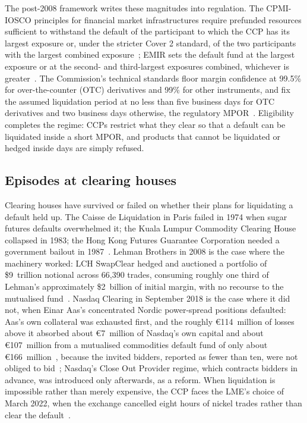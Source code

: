 \documentclass[11pt,a4paper]{article}
\begin{document}
The post-2008 framework writes these magnitudes into regulation. The CPMI-IOSCO principles for financial market infrastructures require prefunded resources sufficient to withstand the default of the participant to which the CCP has its largest exposure or, under the stricter Cover 2 standard, of the two participants with the largest combined exposure~\cite{pfmi}; EMIR sets the default fund at the largest exposure or at the second- and third-largest exposures combined, whichever is greater~\cite{emir}. The Commission's technical standards floor margin confidence at 99.5\% for over-the-counter (OTC) derivatives and 99\% for other instruments, and fix the assumed liquidation period at no less than five business days for OTC derivatives and two business days otherwise, the regulatory MPOR~\cite{cdr153}. Eligibility completes the regime: CCPs restrict what they clear so that a default can be liquidated inside a short MPOR, and products that cannot be liquidated or hedged inside days are simply refused.

\subsection{Episodes at clearing houses}

Clearing houses have survived or failed on whether their plans for liquidating a default held up. The Caisse de Liquidation in Paris failed in 1974 when sugar futures defaults overwhelmed it; the Kuala Lumpur Commodity Clearing House collapsed in 1983; the Hong Kong Futures Guarantee Corporation needed a government bailout in 1987~\cite{norman}. Lehman Brothers in 2008 is the case where the machinery worked: LCH SwapClear hedged and auctioned a portfolio of \$9~trillion notional across 66,390 trades, consuming roughly one third of Lehman's approximately \$2~billion of initial margin, with no recourse to the mutualised fund~\cite{lch}. Nasdaq Clearing in September 2018 is the case where it did not, when Einar Aas's concentrated Nordic power-spread positions defaulted: Aas's own collateral was exhausted first, and the roughly \euro{}114~million of losses above it absorbed about \euro{}7~million of Nasdaq's own capital and about \euro{}107~million from a mutualised commodities default fund of only about \euro{}166~million~\cite{aas}, because the invited bidders, reported as fewer than ten, were not obliged to bid~\cite{aasauction}; Nasdaq's Close Out Provider regime, which contracts bidders in advance, was introduced only afterwards, as a reform. When liquidation is impossible rather than merely expensive, the CCP faces the LME's choice of March 2022, when the exchange cancelled eight hours of nickel trades rather than clear the default~\cite{lme}.
\end{document}
